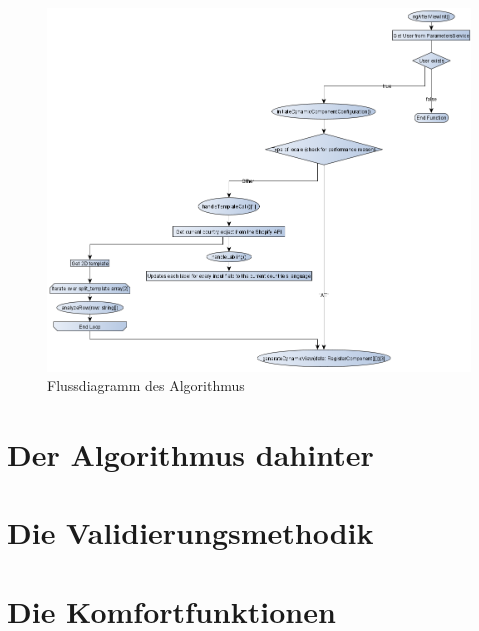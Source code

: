 \begin{figure}[H]
	\centerline{
		\includegraphics[width=1\textwidth, frame]{./grafiken/RF_Flussdiagramm.png}
	}
	\vskip0pt
	\caption{Flussdiagramm des Algorithmus}
\end{figure}
\section{Der Algorithmus dahinter}

\section{Die Validierungsmethodik}

\section{Die Komfortfunktionen}

